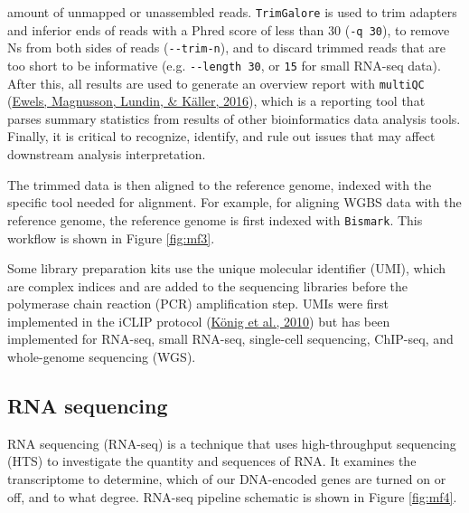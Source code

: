 \documentclass[12pt,twoside]{reedthesis}
\begin{document}
amount of unmapped or unassembled reads. \texttt{TrimGalore} is used to trim
adapters and inferior ends of reads with a Phred score of less than 30
(\texttt{-q\ 30}), to remove Ns from both sides of reads (\texttt{-\/-trim-n}), and to
discard trimmed reads that are too short to be informative (e.g.
\texttt{-\/-length\ 30}, or \texttt{15} for small RNA-seq data). After this, all results are
used to generate an overview report with \texttt{multiQC} (\protect\hyperlink{ref-ewels2016}{Ewels, Magnusson, Lundin, \& Käller, 2016}), which is
a reporting tool that parses summary statistics from results of other
bioinformatics data analysis tools. Finally, it is critical to
recognize, identify, and rule out issues that may affect downstream
analysis interpretation.

The trimmed data is then aligned to the reference genome, indexed with
the specific tool needed for alignment. For example, for aligning WGBS
data with the reference genome, the reference genome is first indexed
with \texttt{Bismark}. This workflow is shown in Figure \ref{fig:mf3}.

Some library preparation kits use the unique molecular identifier (UMI),
which are complex indices and are added to the sequencing libraries
before the polymerase chain reaction (PCR) amplification step. UMIs were
first implemented in the iCLIP protocol (\protect\hyperlink{ref-kuxf6nig2010}{König et al., 2010}) but has been
implemented for RNA-seq, small RNA-seq, single-cell sequencing,
ChIP-seq, and whole-genome sequencing (WGS).

\hypertarget{m3.2}{%
\subsection*{RNA sequencing}\label{m3.2}}

RNA sequencing (RNA-seq) is a technique that uses high-throughput
sequencing (HTS) to investigate the quantity and sequences of RNA. It
examines the transcriptome to determine, which of our DNA-encoded genes
are turned on or off, and to what degree. RNA-seq pipeline schematic is
shown in Figure \ref{fig:mf4}.
\end{document}
